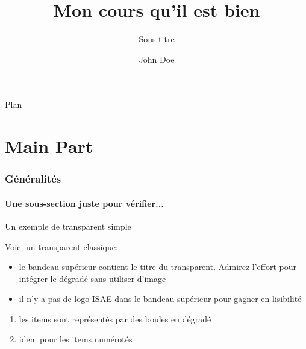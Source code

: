 \documentclass{beamer}
\begin{document}
\title[Petit titre]{Mon cours qu'il est bien}
\subtitle{Sous-titre}
\author{John Doe}
\subject{Slides to present my beamer class for ISAE slides.}
\date{}

\begin{frame}{}
  \titlepage
\end{frame}

\begin{frame}{Plan}
  \tableofcontents[part=1,pausesections]
\end{frame}


\part<presentation>{Main Part}

\section{Généralités}
\label{sec:gen}

\subsection{Une sous-section juste pour vérifier...}
\label{sec:sub}

\begin{frame}{Un exemple de transparent simple}

\vfill

Voici un transparent classique:

\begin{itemize}
\item le bandeau supérieur contient le titre du transparent. Admirez
  l'effort pour intégrer le dégradé sans utiliser d'image \smiley
\item il n'y a pas de logo ISAE dans le bandeau supérieur pour gagner
  en lisibilité
\end{itemize}

\begin{enumerate}
\item les items sont représentés par des boules en dégradé
\item idem pour les items numérotés
\end{enumerate}

\vfill

\end{frame}
\end{document}
